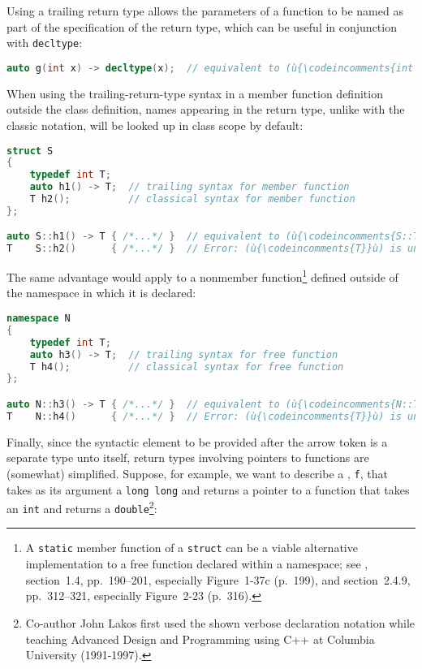 \noindent Using a trailing return type allows the parameters of a function to be
named as part of the specification of the return type, which can be
useful in conjunction with \lstinline!decltype!:

\begin{lstlisting}[language=C++]
auto g(int x) -> decltype(x);  // equivalent to (ù{\codeincomments{int g(int x);}}ù)
\end{lstlisting}
    
\noindent When using the trailing-return-type syntax in a member function
definition outside the class definition, names appearing in the return
type, unlike with the classic notation, will be looked up in class scope
by default:

\begin{lstlisting}[language=C++]
struct S
{
    typedef int T;
    auto h1() -> T;  // trailing syntax for member function
    T h2();          // classical syntax for member function
};

auto S::h1() -> T { /*...*/ }  // equivalent to (ù{\codeincomments{S::T S::h1() \{ /\*...\*/ \}}}ù)
T    S::h2()      { /*...*/ }  // Error: (ù{\codeincomments{T}}ù) is unknown in this context.
\end{lstlisting}
    
\noindent The same advantage would apply to a nonmember
function{\cprotect\footnote{A \lstinline!static! member function of a
\lstinline!struct! can be a viable alternative implementation to a free
function declared within a namespace; see \cite{lakos20}, section~1.4,
pp.~190--201, especially Figure~1-37c (p.~199), and section~2.4.9, pp.~312--321, especially Figure~2-23 (p.~316).}} defined outside of the namespace in
which it is declared:

\begin{lstlisting}[language=C++]
namespace N
{
    typedef int T;
    auto h3() -> T;  // trailing syntax for free function
    T h4();          // classical syntax for free function
};

auto N::h3() -> T { /*...*/ }  // equivalent to (ù{\codeincomments{N::T N::h3() \{ /\*...\*/ \}}}ù)
T    N::h4()      { /*...*/ }  // Error: (ù{\codeincomments{T}}ù) is unknown in this context.
\end{lstlisting}
    

Finally, since the syntactic element to be provided after the arrow
token is a separate type unto itself, return types involving pointers to
functions are (somewhat) simplified. Suppose, for example, we want to
describe a , \lstinline!f!, that takes as its
argument a \lstinline!long!~\lstinline!long! and returns a pointer to a
function that takes an \lstinline!int! and returns a
\lstinline!double!{\cprotect\footnote{Co-author John Lakos first used the shown verbose declaration notation
while teaching Advanced Design and Programming using C++ at Columbia
  University (1991-1997).}}:

